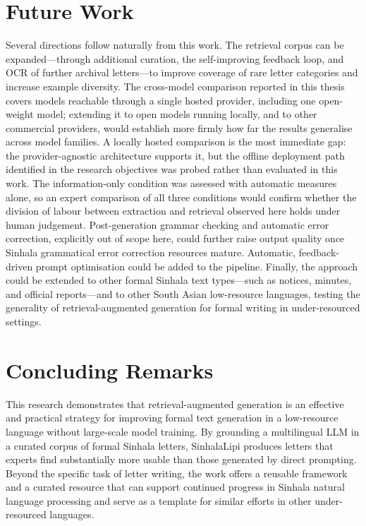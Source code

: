 \documentclass[12pt]{uomthesis}
\begin{document}
\section{Future Work}
Several directions follow naturally from this work. The retrieval corpus can be expanded—through additional curation, the self-improving feedback loop, and OCR of further archival letters—to improve coverage of rare letter categories and increase example diversity. The cross-model comparison reported in this thesis covers models reachable through a single hosted provider, including one open-weight model; extending it to open models running locally, and to other commercial providers, would establish more firmly how far the results generalise across model families. A locally hosted comparison is the most immediate gap: the provider-agnostic architecture supports it, but the offline deployment path identified in the research objectives was probed rather than evaluated in this work. The information-only condition was assessed with automatic measures alone, so an expert comparison of all three conditions would confirm whether the division of labour between extraction and retrieval observed here holds under human judgement. Post-generation grammar checking and automatic error correction, explicitly out of scope here, could further raise output quality once Sinhala grammatical error correction resources mature. Automatic, feedback-driven prompt optimisation could be added to the pipeline. Finally, the approach could be extended to other formal Sinhala text types—such as notices, minutes, and official reports—and to other South Asian low-resource languages, testing the generality of retrieval-augmented generation for formal writing in under-resourced settings.

\section{Concluding Remarks}
This research demonstrates that retrieval-augmented generation is an effective and practical strategy for improving formal text generation in a low-resource language without large-scale model training. By grounding a multilingual LLM in a curated corpus of formal Sinhala letters, SinhalaLipi produces letters that experts find substantially more usable than those generated by direct prompting. Beyond the specific task of letter writing, the work offers a reusable framework and a curated resource that can support continued progress in Sinhala natural language processing and serve as a template for similar efforts in other under-resourced languages.
\end{document}
